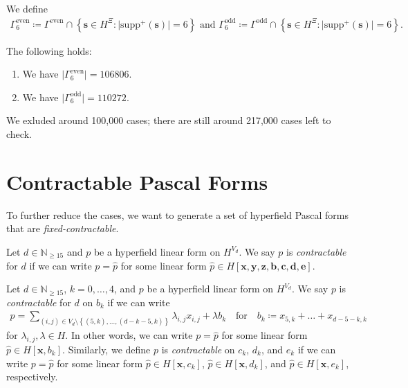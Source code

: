 \begin{definition}
    We define 
    \begin{gather*}
        \Gamma^{\mathrm{even}}_6 \coloneqq \Gamma^{\mathrm{even}} \cap \left\{ \mathbf{s} \in H^{\Xi} : \lvert \mathrm{supp}^+(\mathbf{s}) \rvert = 6 \right\}
        \text{ and }
        \Gamma^{\mathrm{odd}}_6 \coloneqq \Gamma^{\mathrm{odd}} \cap \left\{ \mathbf{s} \in H^{\Xi} : \lvert \mathrm{supp}^+(\mathbf{s}) \rvert = 6 \right\}.
    \end{gather*}
\end{definition}


\begin{proposition}
    The following holds:
    \begin{enumerate}
        \item We have \( \lvert \Gamma^{\mathrm{even}}_6 \rvert  = 106806\).
        \item We have \( \lvert \Gamma^{\mathrm{odd}}_6 \rvert  = 110272\).
    \end{enumerate}
\end{proposition}

We exluded around 100,000 cases; there are still around 217,000 cases left to check.

\section{Contractable Pascal Forms}

To further reduce the cases, we want to generate a set of hyperfield Pascal forms that are \emph{fixed-contractable}.

\begin{definition}
    Let \( d \in \mathbb{N}_{\geq 15} \) and \( p \) be a hyperfield linear form on \( H^{V_d} \). We say \( p \) is \emph{contractable} for \( d \) if we can write \( p = \hat p \) for some linear form \( \hat p \in H[\mathbf{x}, \mathbf{y}, \mathbf{z}, \mathbf{b}, \mathbf{c}, \mathbf{d}, \mathbf{e}] \). 
\end{definition}

\begin{definition}
    Let \( d \in \mathbb{N}_{\geq 15} \), \( k = 0, \dots ,4 \), and \( p \) be a hyperfield linear form on \( H^{V_d} \). We say \( p \) is \emph{contractable} for \( d \) on \( b_k \) if we can write
    \begin{align*}
        p = \sum_{(i,j) \in V_d \setminus \left\{ (5,k), \dots, (d-k-5, k) \right\}} \lambda_{i,j} x_{i,j}  +\lambda b_k \quad \text{for} \quad b_k \coloneqq x_{5,k} + \dots + x_{d-5-k,k}
    \end{align*}
    for \( \lambda_{i,j}, \lambda \in H \). In other words, we can write \( p = \hat p \) for some linear form \( \hat p \in H[\mathbf{x}, b_k] \). 
    Similarly, we define \( p \) is \emph{contractable} on \( c_k \), \( d_k \), and \( e_k \) if we can write \( p = \hat p \) for some linear form \( \hat p \in H[\mathbf{x}, c_k] \), \( \hat p \in H[\mathbf{x}, d_k] \), and \( \hat p \in H[\mathbf{x}, e_k] \), respectively.
\end{definition}

